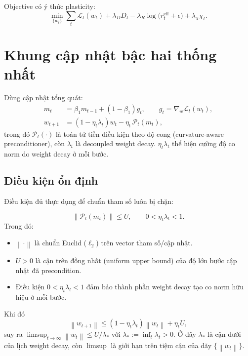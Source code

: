 \documentclass[11pt]{article}
\newcommand{\norm}[1]{\left\lVert #1 \right\rVert}
\begin{document}
Objective có ý thức plasticity:
\begin{equation}
\min_{\{w_t\}}\sum_t \mathcal{L}_t(w_t)
+ \lambda_D D_t
- \lambda_R \log\big(r_t^{\mathrm{eff}}+\epsilon\big)
+ \lambda_\chi \chi_t.
\label{eq:lop_objective}
\end{equation}

\section{Khung cập nhật bậc hai thống nhất}
Dùng cập nhật tổng quát:
\begin{equation}
\begin{aligned}
m_t &= \beta_1 m_{t-1} + (1-\beta_1) g_t,\qquad g_t = \nabla_w \mathcal{L}_t(w_t),\\
w_{t+1} &= (1-\eta_t\lambda_t) w_t - \eta_t\,\mathcal{P}_t(m_t),
\end{aligned}
\label{eq:generic_update}
\end{equation}
trong đó $\mathcal{P}_t(\cdot)$ là toán tử tiền điều kiện theo độ cong (curvature-aware preconditioner), còn $\lambda_t$ là decoupled weight decay.
$\eta_t\lambda_t$ thể hiện cường độ co norm do weight decay ở mỗi bước.

\subsection{Điều kiện ổn định}
Điều kiện đủ thực dụng để chuẩn tham số luôn bị chặn:

\begin{equation}
\norm{\mathcal{P}_t(m_t)} \le U,\qquad 0<\eta_t\lambda_t<1.
\end{equation}
Trong đó:
\begin{itemize}
\item $\norm{\cdot}$ là chuẩn Euclid ($\ell_2$) trên vector tham số/cập nhật.
\item $U>0$ là cận trên đồng nhất (uniform upper bound) của độ lớn bước cập nhật đã precondition.
\item Điều kiện $0<\eta_t\lambda_t<1$ đảm bảo thành phần weight decay tạo co norm hữu hiệu ở mỗi bước.
\end{itemize}
Khi đó
\begin{equation}
\norm{w_{t+1}} \le (1-\eta_t\lambda_t)\norm{w_t} + \eta_t U,
\end{equation}
suy ra $\limsup_{t\to\infty}\norm{w_t} \le U/\lambda_*$ với $\lambda_*:=\inf_t \lambda_t>0$.
Ở đây $\lambda_*$ là cận dưới của lịch weight decay, còn $\limsup$ là giới hạn trên tiệm cận của dãy $\{\norm{w_t}\}$.
\end{document}
